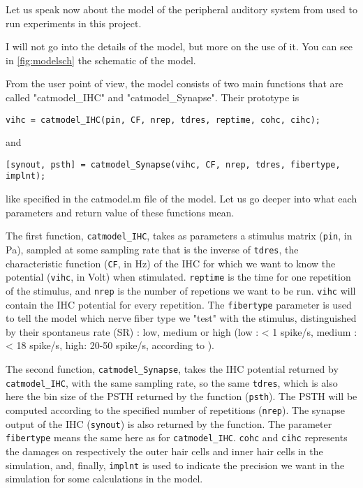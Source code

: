 Let us speak now about the model of the peripheral auditory system from 
\cite{Model1, Model2, Model3} used to run experiments in this project. 

I will not go into the details of the model, but more on the use of it. 
You can see in \autoref{fig:modelsch} the schematic of the model.



From the user point of view, the model consists of two main functions 
that are called "catmodel\_IHC" and "catmodel\_Synapse". Their prototype is

\texttt{vihc = catmodel\_IHC(pin, CF, nrep, tdres, reptime, cohc, cihc);}

and

\texttt{[synout, psth] = catmodel\_Synapse(vihc, CF, nrep, tdres, fibertype, implnt);}

like specified in the catmodel.m file of the model. 
Let us go deeper into what each parameters and return value of these functions mean.

The first function, \texttt{catmodel\_IHC}, takes as parameters 
a stimulus matrix (\texttt{pin}, in Pa), sampled at some sampling rate that is 
the inverse of \texttt{tdres}, the characteristic function (\texttt{CF}, in Hz) 
of the IHC for which we want to know the potential 
(\texttt{vihc}, in Volt) when stimulated. 
\texttt{reptime} is the time for one repetition of the stimulus, 
and \texttt{nrep} is the number of repetions we want to be run. 
\texttt{vihc} will contain the IHC potential for every repetition.
The \texttt{fibertype} parameter is used to tell the model which nerve fiber type
we "test" with the stimulus, distinguished by their spontaneus rate (SR) : 
low, medium or high (low : < 1 spike/s, medium : < 18 spike/s, high: 20-50 spike/s, 
according to \cite{AuditoryNeuroscience}). %

The second function, \texttt{catmodel\_Synapse}, 
takes the IHC potential returned by \texttt{catmodel\_IHC}, 
with the same sampling rate, so the same \texttt{tdres}, which is also here the bin size
of the PSTH returned by the function (\texttt{psth}). 
The PSTH will be computed according to the specified number of repetitions (\texttt{nrep}).
The synapse output of the IHC (\texttt{synout}) is also returned by the function. 
The parameter \texttt{fibertype} means the same here as for \texttt{catmodel\_IHC}.
\texttt{cohc} and \texttt{cihc} represents the damages on respectively 
the outer hair cells and inner hair cells in the simulation, and, finally, 
\texttt{implnt} is used to indicate the precision we want in the simulation 
for some calculations in the model.

